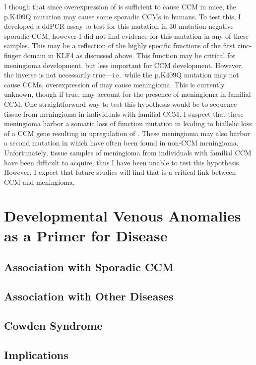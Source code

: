 I though that since overexpression of  is sufficient to cause CCM in mice, the p.K409Q mutation may cause some sporadic CCMs in humans. To test this, I developed a ddPCR assay to test for this mutation in 30 mutation-negative sporadic CCM, however I did not find evidence for this mutation in any of these samples. This may be a reflection of the highly specific functions of the first zinc-finger domain in KLF4 as discussed above. This function may be critical for meningioma development, but less important for CCM development. However, the inverse is not necessarily true—i.e.~while the p.K409Q mutation may not cause CCMs, overexpression of  may cause meningioma. This is currently unknown, though if true, may account for the presence of meningioma in familial CCM. One straightforward way to test this hypothesis would be to sequence tissue from meningioma in individuals with familial CCM. I suspect that these meningioma harbor a somatic loss of function mutation in  leading to biallelic loss of a CCM gene resulting in upregulation of . These meningioma may also harbor a second mutation in  which have often been found in non-CCM meningioma. Unfortunately, tissue samples of meningioma from individuals with familial CCM have been difficult to acquire, thus I have been unable to test this hypothesis. However, I expect that future studies will find that  is a critical link between CCM and meningioma. 











\section{Developmental Venous Anomalies as a Primer for Disease}
\subsection{Association with Sporadic CCM}
\subsection{Association with Other Diseases}
\subsection{Cowden Syndrome}
\subsection{Implications}













